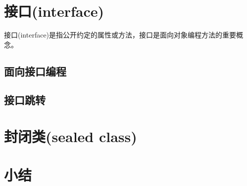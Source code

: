 \section{接口(interface)}
接口(interface)是指公开约定的属性或方法，接口是面向对象编程方法的重要概念。



\subsection{面向接口编程}

\subsection{接口跳转}


\section{封闭类(sealed class)}

\section{小结}